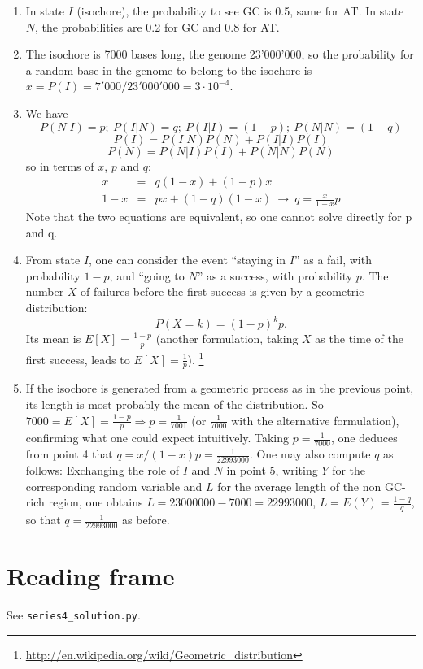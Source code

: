 \documentclass[a4paper,11pt]{article}
\begin{document}
\begin{enumerate}
\item In state $I$ (isochore), the probability to see GC is 0.5, same for AT. In state $N$, the probabilities are 0.2 for GC and 0.8 for AT.
\item The isochore is 7000 bases long, the genome 23'000'000, so the probability for a random base in the genome to belong to the isochore is $x = P(I) = 7'000/23'000'000 = 3\cdot 10^{-4}$.
\item We have
$$ P(N|I)=p; \ P(I|N)=q; \ P(I|I)=(1-p); \ P(N|N)=(1-q)$$
$$ P(I) = P(I|N)P(N) + P(I|I)P(I) $$
$$ P(N) = P(N|I)P(I) + P(N|N)P(N) $$
so in terms of $x$, $p$ and $q$:
\begin{eqnarray*}
x &=& q(1-x) + (1-p)x\\ 
1-x &=& px + (1-q)(1-x)   \ \rightarrow \ q = \frac{x}{1-x} p
\end{eqnarray*}
Note that the two equations are equivalent, so one cannot solve directly for p and q.
\item From state $I$, one can consider the event ``staying in $I$'' as a fail, with probability $1-p$, and ``going to $N$'' as a success, with probability $p$. The number $X$ of failures before the first success is given by a geometric distribution:
$$ P(X=k) = (1-p)^k p .$$
Its mean is $E[X] = \frac{1-p}{p}$ (another formulation, taking $X$ as the time of the first success, leads to $E[X] = \frac{1}{p}$).
\footnote{\url{http://en.wikipedia.org/wiki/Geometric_distribution}}
\item If the isochore is generated from a geometric process as in the previous point, its length is most probably the mean of the distribution. So $7000 = E[X] = \frac{1-p}{p} \Rightarrow p = \frac{1}{7001}$ (or $\frac{1}{7000}$ with the alternative formulation), confirming what one could expect intuitively. Taking $p=\frac{1}{7000}$, one deduces from point 4 that $q = x/(1-x) p = \frac{1}{22993000}$. One may also compute $q$ as follows: Exchanging the role of $I$ and $N$ in point 5, writing $Y$ for the corresponding random variable and $L$ for the average length of the non GC-rich region, one obtains $L= 23000000-7000 = 22993000$, $L = E(Y) =  \frac{1-q}{q}$, so that $q = \frac{1}{22993000}$ as before.
\end{enumerate}

\section{Reading frame}

See \texttt{series4\_solution.py}.
\end{document}
